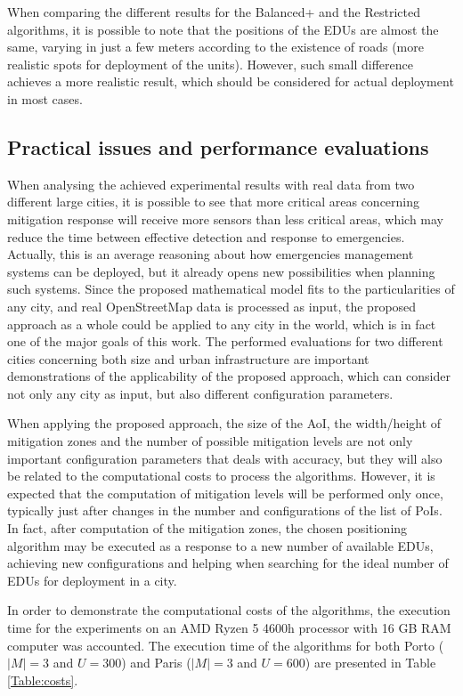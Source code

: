 \begin{refsection}
When comparing the different results for the Balanced+ and the Restricted algorithms, it is possible to note that the positions of the EDUs are almost the same, varying in just a few meters according to the existence of roads (more realistic spots for deployment of the units). However, such small difference achieves a more realistic result, which should be considered for actual deployment in most cases.

\subsection{Practical issues and performance evaluations}

When analysing the achieved experimental results with real data from two different large cities, it is possible to see that more critical areas concerning mitigation response will receive more sensors than less critical areas, which may reduce the time between effective detection and response to emergencies. Actually, this is an average reasoning about how emergencies management systems can be deployed, but it already opens new possibilities when planning such systems. Since the proposed mathematical model fits to the particularities of any city, and real OpenStreetMap data is processed as input, the proposed approach as a whole could be applied to any city in the world, which is in fact one of the major goals of this work. The performed evaluations for two different cities concerning both size and urban infrastructure are important demonstrations of the applicability of the proposed approach, which can consider not only any city as input, but also different configuration parameters.

When applying the proposed approach, the size of the AoI, the width/height of mitigation zones and the number of possible mitigation levels are not only important configuration parameters that deals with accuracy, but they will also be related to the computational costs to process the algorithms. However, it is expected that the computation of mitigation levels will be performed only once, typically just after changes in the number and configurations of the list of PoIs. In fact, after computation of the mitigation zones, the chosen positioning algorithm may be executed as a response to a new number of available EDUs, achieving new configurations and helping when searching for the ideal number of EDUs for deployment in a city. 

In order to demonstrate the computational costs of the algorithms, the execution time for the experiments on an AMD Ryzen 5 4600h processor with 16 GB RAM computer was accounted. The execution time of the algorithms for both Porto ($|M|=3$ and $U=300$) and Paris ($|M|=3$ and $U=600$) are presented in Table \ref{Table:costs}.


\end{refsection}
